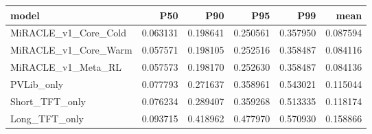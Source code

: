 \begin{tabular}{lrrrrr}
\toprule
model & P50 & P90 & P95 & P99 & mean \\
\midrule
MiRACLE_v1_Core_Cold & 0.063131 & 0.198641 & 0.250561 & 0.357950 & 0.087594 \\
MiRACLE_v1_Core_Warm & 0.057571 & 0.198105 & 0.252516 & 0.358487 & 0.084116 \\
MiRACLE_v1_Meta_RL & 0.057573 & 0.198170 & 0.252630 & 0.358487 & 0.084136 \\
PVLib_only & 0.077793 & 0.271637 & 0.358961 & 0.543021 & 0.115044 \\
Short_TFT_only & 0.076234 & 0.289407 & 0.359268 & 0.513335 & 0.118174 \\
Long_TFT_only & 0.093715 & 0.418962 & 0.477970 & 0.570930 & 0.158866 \\
\bottomrule
\end{tabular}
